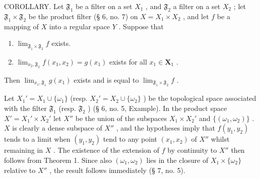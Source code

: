 COROLLARY. Let \(\mathfrak{F}_1\) be a filter on a set \(X_1\) , and \(\mathfrak{F}_2\) a filter on a set \(X_2\) ; let \(\mathfrak{F}_1 \times \mathfrak{F}_2\) be the product filter (§ 6, no. 7) on \(X = X_1 \times X_2\) , and let \(f\) be a mapping of \(X\) into a regular space \(Y\) . Suppose that

\begin{enumerate}
\def\labelenumi{\alph{enumi})}
\item
  \(\lim_{\mathfrak{F}_1\times \mathfrak{F}_2}f\) exists.
\item
  \(\lim_{x_2, \mathfrak{F}_2} f(x_1, x_2) = g(x_1)\) exists for all \(x_1 \in \mathbf{X}_1\) .
\end{enumerate}

Then \(\lim_{x_1, \mathfrak{F}_1} g(x_1)\) exists and is equal to \(\lim_{\mathfrak{F}_1 \times \mathfrak{F}_2} f\) .

Let \(X_1' = X_1 \cup \{ \omega_1 \}\) (resp. \(X_2' = X_2 \cup \{ \omega_2 \}\) ) be the topological space associated with the filter \(\mathfrak{F}_1\) (resp. \(\mathfrak{F}_2\) ) (§ 6, no. 5, Example). In the product space \(X' = X_1' \times X_2'\) let \(X''\) be the union of the subspaces \(X_1 \times X_2'\) and \(\{ (\omega_1, \omega_2) \}\) . \(X\) is clearly a dense subspace of \(X''\) , and the hypotheses imply that \(f(y_1, y_2)\) tends to a limit when \((y_1, y_2)\) tend to any point \((x_1, x_2)\) of \(X''\) whilst remaining in \(X\) . The existence of the extension of \(f\) by continuity to \(X''\) then follows from Theorem 1. Since also \((\omega_1, \omega_2)\) lies in the closure of \(X_1 \times \{ \omega_2 \}\) relative to \(X''\) , the result follows immediately (§ 7, no. 5).

